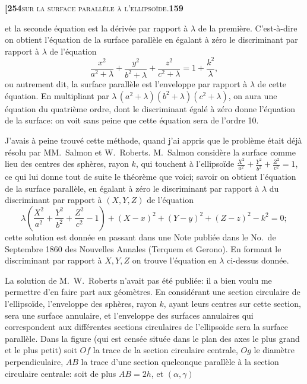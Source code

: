 \documentclass[11pt]{article}
\begin{document}
\newpage

\noindent\textbf{[254}\hfill\textsc{sur la surface parallèle à l'ellipsoïde.}\hfill\textbf{159}

\medskip

\noindent et la seconde équation est la dérivée par rapport à $\lambda$ de la première. C'est-à-dire on obtient l'équation de la surface parallèle en égalant à zéro le discriminant par rapport à $\lambda$ de l'équation
\[
\frac{x^2}{a^2 + \lambda} + \frac{y^2}{b^2 + \lambda} + \frac{z^2}{c^2 + \lambda} = 1 + \frac{k^2}{\lambda},
\]
ou autrement dit, la surface parallèle est l'enveloppe par rapport à $\lambda$ de cette équation. En multipliant par $\lambda\,(a^2 + \lambda)(b^2 + \lambda)(c^2 + \lambda)$, on aura une équation du quatrième ordre, dont le discriminant égalé à zéro donne l'équation de la surface: on voit sans peine que cette équation sera de l'ordre 10.

J'avais à peine trouvé cette méthode, quand j'ai appris que le problème était déjà résolu par MM.~Salmon et W.~Roberts. M.~Salmon considère la surface comme lieu des centres des sphères, rayon $k$, qui touchent à l'ellipsoïde $\tfrac{X^2}{a^2} + \tfrac{Y^2}{b^2} + \tfrac{Z^2}{c^2} = 1$, ce qui lui donne tout de suite le théorème que voici; savoir on obtient l'équation de la surface parallèle, en égalant à zéro le discriminant par rapport à $\lambda$ du discriminant par rapport à $(X, Y, Z)$ de l'équation
\[
\lambda\left(\frac{X^2}{a^2} + \frac{Y^2}{b^2} + \frac{Z^2}{c^2} - 1\right) + (X - x)^2 + (Y - y)^2 + (Z - z)^2 - k^2 = 0;
\]
cette solution est donnée en passant dans une Note publiée dans le No.\ de Septembre 1860 des Nouvelles Annales (Terquem et Gerono). En formant le discriminant par rapport à $X, Y, Z$ on trouve l'équation en $\lambda$ ci-dessus donnée.

La solution de M.~W.~Roberts n'avait pas été publiée: il a bien voulu me permettre d'en faire part aux géomètres. En considérant une section circulaire de l'ellipsoïde, l'enveloppe des sphères, rayon $k$, ayant leurs centres sur cette section, sera une surface annulaire, et l'enveloppe des surfaces annulaires qui correspondent aux différentes sections circulaires de l'ellipsoïde sera la surface parallèle. Dans la figure (qui est censée située dans le plan des axes le plus grand et le plus petit) soit $Of$ la trace de la section circulaire centrale, $Og$ le diamètre perpendiculaire, $AB$ la trace d'une section quelconque parallèle à la section circulaire centrale: soit de plus $AB = 2h$, et $(\alpha, \gamma)$
\end{document}
